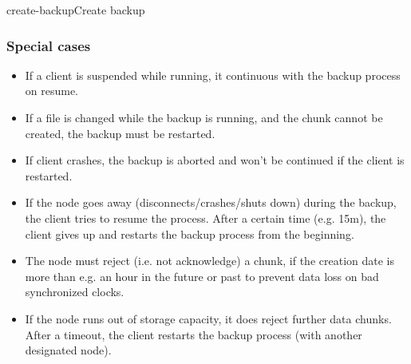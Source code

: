 \begin{scenario}{create-backup}{Create backup}
    \subsubsection{Special cases}
 	\begin{itemize}
	 	\item If a client is suspended while running, it continuous with the backup process on resume. %
	 	\item If a file is changed while the backup is running, and the chunk cannot be created, the backup must be restarted. %
		\item If client crashes, the backup is aborted and won't be continued if the client is restarted.
		\item If the node goes away (disconnects/crashes/shuts down) during the backup, the client tries to resume the process. After a certain time (e.g. 15m), the client gives up and restarts the backup process from the beginning.
		\item The node must reject (i.e. not acknowledge) a chunk, if the creation date is more than e.g. an hour in the future or past to prevent data loss on bad synchronized clocks.
		\item If the node runs out of storage capacity, it does reject further data chunks. After a timeout, the client restarts the backup process (with another designated node).
	\end{itemize}
    
\end{scenario}


